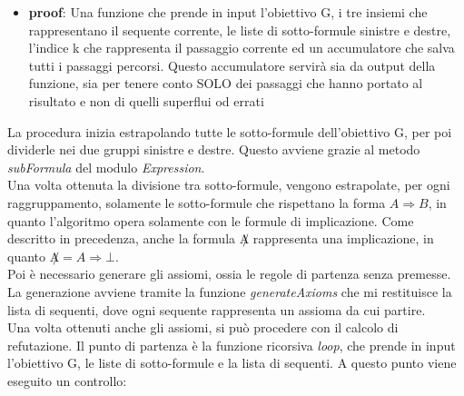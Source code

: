 \documentclass[\main/tesi.tex]{subfiles}
\begin{document}
\begin{itemize}
\begin{itemize}
              \item \textbf{proof}: Una funzione che prende in input l'obiettivo G, i tre insiemi che rappresentano il sequente corrente, le liste di sotto-formule sinistre e destre, l'indice k che rappresenta il passaggio corrente ed un accumulatore che salva tutti i passaggi percorsi. Questo accumulatore servirà sia da output della funzione, sia per tenere conto SOLO dei passaggi che hanno portato al risultato e non di quelli superflui od errati
          \end{itemize}
\end{itemize}
La procedura inizia estrapolando tutte le sotto-formule dell'obiettivo G, per poi dividerle nei due gruppi sinistre e destre. Questo avviene grazie al metodo \textit{subFormula} del modulo \textit{Expression}. \\
Una volta ottenuta la divisione tra sotto-formule, vengono estrapolate, per ogni raggruppamento, solamente le sotto-formule che rispettano la forma $A \Rightarrow B$, in quanto l'algoritmo opera solamente con le formule di implicazione. Come descritto in precedenza, anche la formula $\not A$ rappresenta una implicazione, in quanto $\not A = A \Rightarrow \bot$. \\
Poi è necessario generare gli assiomi, ossia le regole di partenza senza premesse. La generazione avviene tramite la funzione \textit{generateAxioms} che mi restituisce la lista di sequenti, dove ogni sequente rappresenta un assioma da cui partire. \\
Una volta ottenuti anche gli assiomi, si può procedere con il calcolo di refutazione. Il punto di partenza è la funzione ricorsiva \textit{loop}, che prende in input l'obiettivo G, le liste di sotto-formule e la lista di sequenti. A questo punto viene eseguito un controllo:
\end{document}
